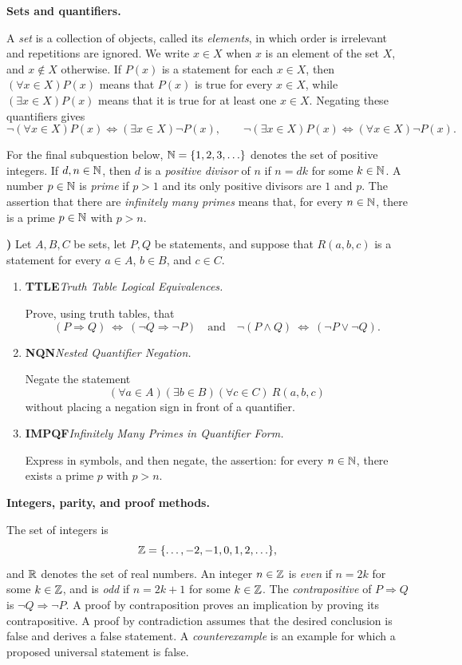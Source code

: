 \documentclass[10pt,a4paper]{article}
\newcounter{examquestion}
\newcommand{\examquestion}[1]{%
  \Needspace{5\baselineskip}%
  \refstepcounter{examquestion}%
  \par\addvspace{0.8\baselineskip}%
  \noindent\textbf{\theexamquestion)}\enspace #1\par
}
\newenvironment{subquestions}
  {\begin{enumerate}[label=\alph*),leftmargin=2.1em]}
  {\end{enumerate}}
\newcommand{\nameditem}[2]{%
  \textbf{\textsf{#1}}\enspace\emph{#2.}\enspace
}
\newcommand{\concept}[1]{%
  \par\addvspace{0.55\baselineskip}\noindent\textbf{#1.}\enspace
}
\begin{document}
\concept{Sets and quantifiers}
A \emph{set} is a collection of objects, called its \emph{elements}, in
which order is irrelevant and repetitions are ignored.  We
write $x\in X$ when $x$ is an element of the set $X$, and $x\notin X$
otherwise.  If $P(x)$ is a statement for each $x\in X$, then
$(\forall x\in X)P(x)$ means that $P(x)$ is true for every $x\in X$, while
$(\exists x\in X)P(x)$ means that it is true for at least one $x\in X$.
Negating these quantifiers gives
\[
  \neg(\forall x\in X)P(x)\Longleftrightarrow
    (\exists x\in X)\neg P(x),\qquad
  \neg(\exists x\in X)P(x)\Longleftrightarrow
    (\forall x\in X)\neg P(x).
\]

For the final subquestion below, $\mathbb{N}=\{1,2,3,\ldots\}$ denotes the set of
positive integers.  If $d,n\in\mathbb{N}$, then $d$ is a \emph{positive divisor}
of $n$ if $n=dk$ for some $k\in\mathbb{N}$.  A number $p\in\mathbb{N}$ is \emph{prime}
if $p>1$ and its only positive divisors are $1$ and $p$.
The assertion that there are \emph{infinitely many primes} means that, for
every $n\in\mathbb{N}$, there is a prime $p\in\mathbb{N}$ with $p>n$.

\examquestion{\label{q:logic}
Let $A,B,C$ be sets, let $P,Q$ be statements, and suppose that $R(a,b,c)$
is a statement for every $a\in A$, $b\in B$, and $c\in C$.
\begin{subquestions}
  \item \nameditem{TTLE}{Truth Table Logical Equivalences}
  Prove, using truth tables, that
  \[
    (P\Rightarrow Q)\ \Longleftrightarrow\
    (\neg Q\Rightarrow\neg P)
    \quad\text{and}\quad
    \neg(P\wedge Q)\ \Longleftrightarrow\ (\neg P\vee\neg Q).
  \]
  \item \nameditem{NQN}{Nested Quantifier Negation}
  Negate the statement
  \[
    (\forall a\in A)(\exists b\in B)(\forall c\in C)\ R(a,b,c)
  \]
  without placing a negation sign in front of a quantifier.
  \item \nameditem{IMPQF}{Infinitely Many Primes in Quantifier Form}
  Express in symbols, and then negate, the assertion: for every
  $n\in\mathbb{N}$, there exists a prime $p$ with $p>n$.
\end{subquestions}}

\concept{Integers, parity, and proof methods}
The set of integers is
\[
  \mathbb{Z}=\{\ldots,-2,-1,0,1,2,\ldots\},
\]
and $\mathbb{R}$ denotes the set of real numbers.  An integer $n\in\mathbb{Z}$ is
\emph{even} if $n=2k$ for some
$k\in\mathbb{Z}$, and is \emph{odd} if $n=2k+1$ for some $k\in\mathbb{Z}$.
The \emph{contrapositive} of $P\Rightarrow Q$ is
$\neg Q\Rightarrow\neg P$.  A proof by contraposition proves an
implication by proving its contrapositive.  A proof by contradiction assumes
that the desired conclusion is false and derives a false statement.  A
\emph{counterexample} is an example for which a proposed universal statement
is false.
\end{document}
